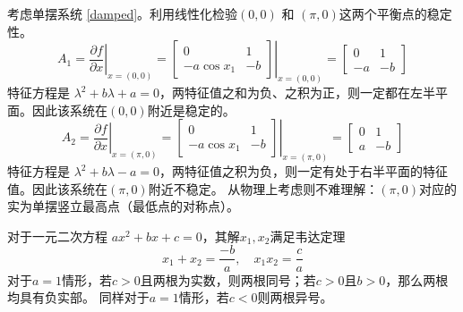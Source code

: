   \begin{example}[通过平衡点附近的线性化判别单摆系统的稳定性]\label{linearization_exp}
   考虑单摆系统 \eqref{damped}。利用线性化检验$(0, 0)$ 和 $(\pi, 0)$这两个平衡点的稳定性。
    \[ A_1 = \left. \frac{\partial f}{\partial x} \right|_{x = (0, 0)} = \left.
       \left[\begin{array}{cc}
         0 & 1\\
         -a\ensuremath{\operatorname{cos}}  x_1 & - b
       \end{array}\right] \right|_{x = (0, 0)} = \left[\begin{array}{cc}
         0 & 1\\
         - a & - b
       \end{array}\right] \]
    特征方程是 $\lambda^2 + b \lambda + a = 0$，两特征值之和为负、之积为正，则一定都在左半平面。因此该系统在$(0, 0)$附近是稳定的。
    \[ A_2 = \left. \frac{\partial f}{\partial x} \right|_{x = (\pi, 0)} =
       \left. \left[\begin{array}{cc}
         0 & 1\\
         -a\ensuremath{\operatorname{cos}}  x_1 & - b
       \end{array}\right] \right|_{x = (\pi, 0)} = \left[\begin{array}{cc}
         0 & 1\\
         a & - b
       \end{array}\right] \]
       特征方程是 $\lambda^2 + b \lambda - a = 0$，两特征值之积为负，则一定有处于右半平面的特征值。因此该系统在$(\pi, 0)$附近不稳定。
      从物理上考虑则不难理解：$(\pi, 0)$对应的实为单摆竖立最高点（最低点的对称点）。
    \begin{note}
      对于一元二次方程 $a  x^2 + b  x + c = 0$，其解$x_{1},x_{2}$满足韦达定理
      \[ x_1 + x_2 = \frac{- b}{a}, \quad x_1  x_2 = \frac{c}{a} \]
      对于$a = 1$情形，若$c > 0$且两根为实数，则两根同号；若$c>0$且$b>0$，那么两根均具有负实部。
      同样对于$a = 1$情形，若$c < 0$则两根异号。
    \end{note}
  \end{example}
